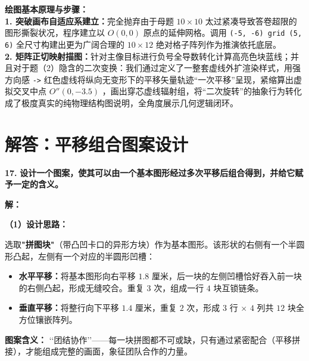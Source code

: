 \vspace{0.6cm}

{\small\color{blue!70!black}
\textbf{绘图基本原理与步骤：}\\
\textbf{1. 突破画布自适应系建立：}完全抛弃由于母题 $10\times10$ 太过紧凑导致答卷超限的图形撕裂状况，程序建立以 $O(0,0)$ 原点的延伸网格。调用 \texttt{(-5, -6) grid (5, 6)} 全尺寸构建出更为广阔合理的 $10\times12$ 绝对格子阵列作为推演依托底层。\\
\textbf{2. 矩阵正切映射描图：}针对主像目标进行负号全导数转化计算高亮色块蓝线；并且对于题（2）隐含的二次变换：我们通过定义了一整套虚线外扩渲染样式，用强方向感 \texttt{->} 红色虚线将纵向无变形下的平移矢量轨迹“一次平移”呈现，紧缩算出虚拟交叉中点 $O''(0, -3.5)$ ，画出穿芯虚线辐射组，将“二次旋转”的抽象行为转化成了极度真实的纯物理结构图说明，全角度展示几何逻辑闭环。
}





\newpage

\section{解答：平移组合图案设计}

\vspace{0.6cm}

\textbf{\LARGE 17.} \textbf{设计一个图案，使其可以由一个基本图形经过多次平移后组合得到，并给它赋予一定的含义。}

\vspace{0.4cm}
\textbf{解：}

\textbf{（1）设计思路：}

选取\textbf{"拼图块"}（带凸凹卡口的异形方块）作为基本图形。该形状的右侧有一个半圆形凸起，左侧有一个对应的半圆形凹槽：
\begin{itemize}
    \item \textbf{水平平移：}将基本图形向右平移 $1.8$ 厘米，后一块的左侧凹槽恰好吞入前一块的右侧凸起，形成无缝咬合。重复 $3$ 次，组成一行 $4$ 块互锁链条。
    \item \textbf{垂直平移：}将整行向下平移 $1.4$ 厘米，重复 $2$ 次，形成 $3$ 行 $\times$ $4$ 列共 $12$ 块全方位镶嵌阵列。
\end{itemize}

\textbf{图案含义：} \lq \lq 团结协作\rq \rq ——每一块拼图都不可或缺，只有通过紧密配合（平移拼接），才能组成完整的画面，象征团队合作的力量。

